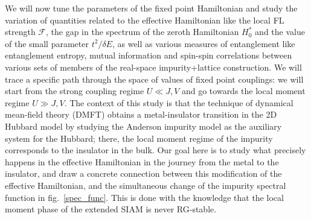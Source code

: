 We will now tune the parameters of the fixed point Hamiltonian and study the variation of quantities related to the effective Hamiltonian like the local FL strength \(\mathcal{F}\), the gap in the spectrum of the zeroth Hamiltonian \(H_0^*\) and the value of the small parameter \(t^2/\delta E\), as well as various measures of entanglement like entanglement entropy, mutual information and spin-spin correlations between various sets of members of the real-space impurity+lattice construction. We will trace a specific path through the space of values of fixed point couplings: we will start from the strong coupling regime \(U \ll J,V\) and go towards the local moment regime \(U \gg J,V\). The context of this study is that the technique of dynamical mean-field theory (DMFT) obtains a metal-insulator transition in the 2D Hubbard model by studying the Anderson impurity model as the auxiliary system for the Hubbard; there, the local moment regime of the impurity corresponds to the insulator in the bulk. Our goal here is to study what precisely happens in the effective Hamiltonian in the journey from the metal to the insulator, and draw a concrete connection between this modification of the effective Hamiltonian, and the simultaneous change of the impurity spectral function in fig.~\ref{spec_func}. This is done with the knowledge that the local moment phase of the extended SIAM is never RG-stable.

